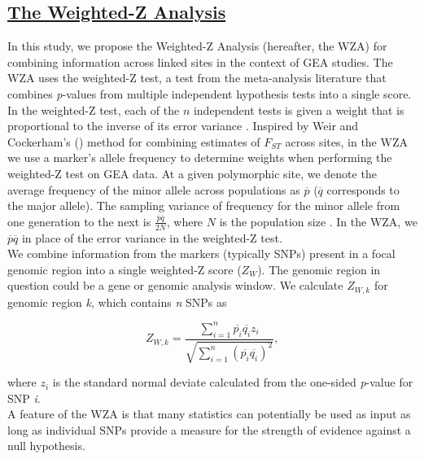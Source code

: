 \documentclass[10pt,twoside,lineno, twocolumn]{GSA_format}
\begin{document}

\subsection{\underline{The Weighted-Z Analysis}} 

In this study, we propose the Weighted-Z Analysis (hereafter, the WZA) for combining information across linked sites in the context of GEA studies. The WZA uses the weighted-Z test, a test from the meta-analysis literature that combines \textit{p}-values from multiple independent hypothesis tests into a single score. In the weighted-Z test, each of the $n$ independent tests is given a weight that is proportional to the inverse of its error variance \citep{WHITLOCK2005}. Inspired by Weir and Cockerham's (\citeyear{Weir1984-tc}) method for combining estimates of $F_{ST}$ across sites, in the WZA we use a marker's allele frequency to determine weights when performing the weighted-Z test on GEA data. At a given polymorphic site, we denote the average frequency of the minor allele across populations as $\overline{p}$ ($\overline{q}$ corresponds to the major allele). The sampling variance of frequency for the minor allele from one generation to the next is $\frac{\overline{p}\overline{q}}{2N}$, where $N$ is the population size \citep{RN173}.  In the WZA, we $\overline{p}\overline{q}$ in place of the error variance in the weighted-Z test. \\

We combine information from the markers (typically SNPs) present in a focal genomic region into a single weighted-Z score ($Z_W$). The genomic region in question could be a gene or genomic analysis window. We calculate $Z_{W,k}$ for genomic region \textit{k}, which contains \textit{n} SNPs as

\begin{equation}
\label{weightedZ}
Z_{W,k} =  \frac {\sum\limits_{i=1}^n \overline{p_i} \overline{q_i}z_i}{\sqrt{ \sum\limits_{i=1}^n (\overline{p_i}\overline{q_i})^2} },
\end{equation}

\noindent where $z_i$ is the standard normal deviate calculated from the one-sided \textit{p}-value for SNP \textit{i}. \\

A feature of the WZA is that many statistics can potentially be used as input as long as individual SNPs provide a measure for the strength of evidence against a null hypothesis. \\
\end{document}
